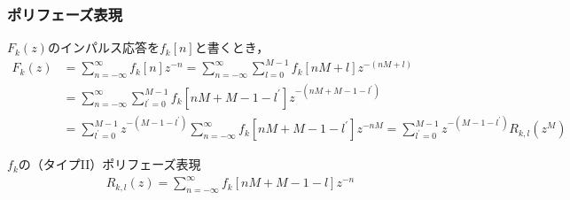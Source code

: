 \documentclass[17pt,xcolor=dvipsnames,table,dvipdfmx]{beamer}
\begin{document}
\begin{frame}[c]
    \frametitle{ポリフェーズ表現}
    $F_{k}(z)$のインパルス応答を$f_{k}[n]$と書くとき，
    \scriptsize
    \begin{align*}
        F_{k}(z) &= \sum_{n = -\infty}^{\infty} f_{k}[n] z^{-n} = \sum_{n = -\infty}^{\infty} \sum_{l = 0}^{M - 1} f_{k}[nM + l] z^{-(nM+l)} \\
        &= \sum_{n = -\infty}^{\infty} \sum_{l^{\prime} = 0}^{M - 1} f_{k}[nM + M - 1 - l^{\prime}] z^{-(nM + M - 1 - l^{\prime})} \\
        &= \sum_{l^{\prime} = 0}^{M - 1} z^{-(M - 1 - l^{\prime})} \sum_{n = -\infty}^{\infty} f_{k}[nM + M - 1 - l^{\prime}] z^{-nM} = \sum_{l^{\prime} = 0}^{M - 1} z^{-(M - 1 - l^{\prime})} R_{k,l}(z^{M})
    \end{align*}
    \normalsize
    \begin{block}{$f_{k}$の（タイプII）ポリフェーズ表現}
        \vspace{-13pt}
        \begin{align}
            R_{k,l}(z) = \sum_{n = -\infty}^{\infty} f_{k}[nM + M - 1 - l] z^{-n} \label{eq:type2_polyphase_representation}
        \end{align}
    \end{block}
\end{frame}
\end{document}
